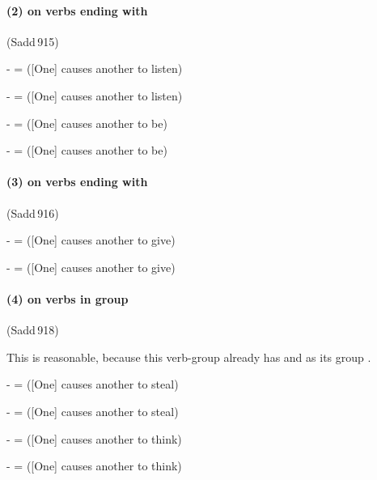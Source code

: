 \paragraph*{(2)  on verbs ending with } (Sadd\,915)\par
-  =  ([One] causes another to listen)\par
-  =  ([One] causes another to listen)\par
-  =  ([One] causes another to be)\par
-  =  ([One] causes another to be)\par

\paragraph*{(3)  on verbs ending with } (Sadd\,916)\par
-  =  ([One] causes another to give)\par
-  =  ([One] causes another to give)\par

\paragraph*{(4)  on verbs in  group} (Sadd\,918)\par
This is reasonable, because this verb-group already has  and  as its group .\par
-  =  ([One] causes another to steal)\par
-  =  ([One] causes another to steal)\par
-  =  ([One] causes another to think)\par
-  =  ([One] causes another to think)\par

